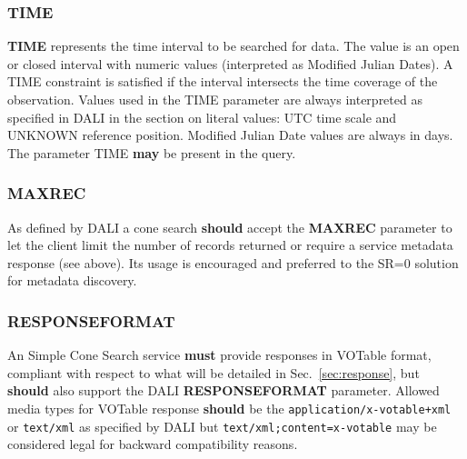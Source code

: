 \documentclass[11pt,a4paper]{ivoa} 
\begin{document}
\subsubsection{TIME} \textbf{TIME} represents the time interval to be
searched for data. The value is an open or closed interval with numeric
values (interpreted as Modified Julian Dates). A TIME constraint is
satisfied if the interval intersects the time coverage of the
observation. Values used in the TIME parameter are always interpreted as
specified in DALI in the section on literal values: UTC time scale and
UNKNOWN reference position. Modified Julian Date values are always in
days. The parameter TIME \textbf{may} be present in the query. 


\subsubsection{MAXREC} As defined by DALI a cone search \textbf{should}
accept the \textbf{MAXREC} parameter to let the client limit the number
of records returned or require a service metadata response (see above).
Its usage is encouraged and preferred to the SR=0 solution for metadata
discovery.

\subsubsection{RESPONSEFORMAT} \label{subsubsec:responseformat} An
Simple Cone Search service \textbf{must} provide responses in VOTable
\citep{std:VOTABLE} format, compliant with respect to what will be
detailed in Sec.~\ref{sec:response}, but \textbf{should} also support
the DALI \textbf{RESPONSEFORMAT} parameter. Allowed media types for
VOTable response \textbf{should} be the
\texttt{application/x-votable+xml} or \texttt{text/xml} as specified by
DALI but \texttt{text/xml;content=x-votable} may be considered legal for
backward compatibility reasons.
\end{document}
